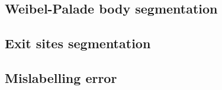 \subsection{Weibel-Palade body segmentation}
\label{endothelial_morphometry:performance_evaluation:WPB}

\subsection{Exit sites segmentation}
\label{endothelial_morphometry:performance_evaluation:exit_sites}

\subsection{Mislabelling error}
\label{endothelial_morphometry:performance_evaluation:cell}
